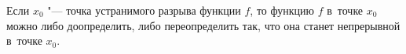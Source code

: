
Если $x_0$ "--- точка устранимого разрыва функции $f$, то функцию $f$ в~точке $x_0$ можно либо доопределить, либо переопределить так, что она станет непрерывной в~точке $x_0$.
